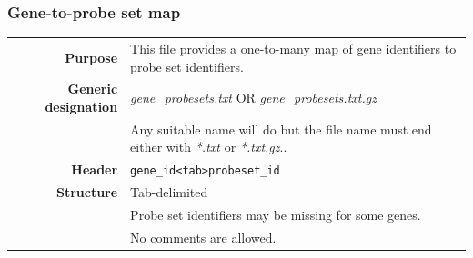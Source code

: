 \documentclass[a4paper,12pt]{article}
\begin{document}
\subsubsection{Gene-to-probe set map}
\label{gep:gene}

\begin{tabular}{rp{12cm}}
\textbf{Purpose} & This file provides a one-to-many map of gene identifiers to probe set identifiers. \\
\textbf{Generic designation} & \textit{gene\_probesets.txt} OR \textit{gene\_probesets.txt.gz} \\
  & Any suitable name will do but the file name must end either with \textit{*.txt} or \textit{*.txt.gz}.. \\
\textbf{Header} & \texttt{gene\_id\textless tab\textgreater probeset\_id} \\
\textbf{Structure} & Tab-delimited \\
  & Probe set identifiers may be missing for some genes. \\
  & No comments are allowed. \\
\end{tabular}
\end{document}
